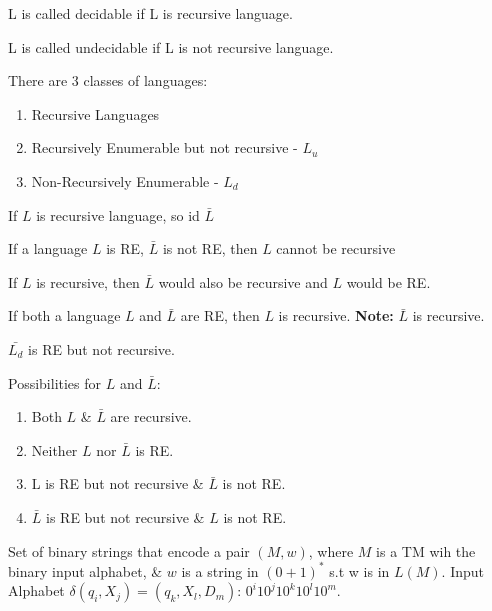 \documentclass[a4paper,oneside]{book}
\begin{document}
\begin{definition}
L is called decidable if L is recursive language.
\end{definition}
\begin{definition}
L is called undecidable if L is not recursive language.
\end{definition}
There are 3 classes of languages:
\begin{enumerate}
\item Recursive Languages
\item Recursively Enumerable but not recursive - $L_u$
\item Non-Recursively Enumerable - $L_d$
\end{enumerate}
\begin{theorem}
If $L$ is recursive language, so id $\bar{L}$
\end{theorem}
\begin{theorem}
If a language $L$ is RE, $\bar{L}$ is not RE, then $L$ cannot be recursive
\end{theorem}
\begin{theorem}
If $L$ is recursive, then $\bar{L}$ would also be recursive and $L$ would be RE.
\end{theorem}
\begin{theorem}
If both a language $L$ and $\bar{L}$ are RE, then $L$ is recursive. \textbf{Note:} $\bar{L}$ is recursive.
\end{theorem}
\begin{theorem}
$\bar{L_d}$ is RE but not recursive.
\end{theorem}
\begin{theorem}
Possibilities for $L$ and $\bar{L}$:
\begin{enumerate}
	\item Both $L$ \& $\bar{L}$ are recursive.
	\item Neither $L$ nor $\bar{L}$ is RE.
	\item L is RE but not recursive \& $\bar{L}$ is not RE.
	\item $\bar{L}$ is RE but not recursive \& $L$ is not RE.
\end{enumerate}
\end{theorem}
\begin{definition}
Set of binary strings that encode a pair $(M,w)$, where $M$ is a TM wih the binary input alphabet, \& $w$ is a string in $(0+1)^*$ s.t w is in $L(M)$. Input Alphabet $\delta(q_i, X_j) = (q_k, X_l, D_m)$: $0^i10^j10^k10^l10^m$.
\end{definition}
\end{document}
